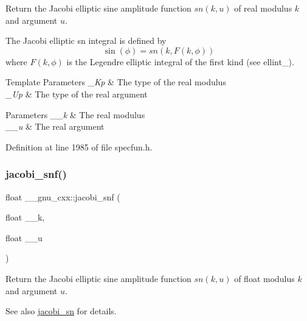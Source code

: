 Return the Jacobi elliptic sine amplitude function $ sn(k,u) $ of real modulus $ k $ and argument $ u $.

The Jacobi elliptic {\ttfamily sn} integral is defined by \[ \sin(\phi) = sn(k, F(k,\phi)) \] where $ F(k,\phi) $ is the Legendre elliptic integral of the first kind (see ellint\+\_).


\begin{DoxyTemplParams}{Template Parameters}
{\em \+\_\+\+Kp} & The type of the real modulus \\
\hline
{\em \+\_\+\+Up} & The type of the real argument \\
\hline
\end{DoxyTemplParams}

\begin{DoxyParams}{Parameters}
{\em \+\_\+\+\_\+k} & The real modulus \\
\hline
{\em \+\_\+\+\_\+u} & The real argument \\
\hline
\end{DoxyParams}


Definition at line 1985 of file specfun.\+h.

\mbox{\label{group__gnu__math__spec__func_ga5981245b7343da6e21d445bb01fdba9c}} 
\subsubsection{\texorpdfstring{jacobi\+\_\+snf()}{jacobi\_snf()}}
{\footnotesize\ttfamily float \+\_\+\+\_\+gnu\+\_\+cxx\+::jacobi\+\_\+snf (\begin{DoxyParamCaption}\item[{float}]{\+\_\+\+\_\+k,  }\item[{float}]{\+\_\+\+\_\+u }\end{DoxyParamCaption})\hspace{0.3cm}{\ttfamily [inline]}}

Return the Jacobi elliptic sine amplitude function $ sn(k,u) $ of {\ttfamily float} modulus $ k $ and argument $ u $.

\begin{DoxySeeAlso}{See also}
\hyperlink{group__gnu__math__spec__func_ga49d5e18152dd0dd0f496b8c8582e7045}{jacobi\+\_\+sn} for details. 
\end{DoxySeeAlso}


